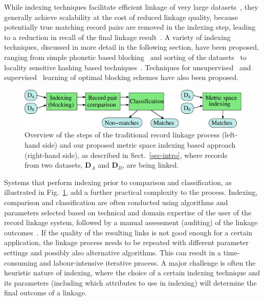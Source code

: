 \documentclass{llncs}
\begin{document}
While indexing techniques facilitate efficient linkage of very large
datasets~\cite{Don15}, they generally achieve scalability at the cost
of reduced linkage quality, because potentially true matching record
pairs are removed in the indexing step, leading to a reduction in recall
of the final linkage result~\cite{Chr12}. A variety of indexing
techniques, discussed in more detail in the following section, have
been proposed, ranging from simple phonetic based blocking~\cite{Chr12}
and sorting of the datasets~\cite{Dra12} to locality sensitive hashing
based techniques~\cite{Kim10,Steorts2014}. Techniques for
unsupervised~\cite{Kej13,Ram15} and supervised~\cite{Bil06,Mic06}
learning of optimal blocking schemes have also been proposed.

\begin{figure}[!t]
  \centering
  \includegraphics[width=1.0\textwidth]{figures/linkage-process}
  \caption{Overview of the steps of the traditional record linkage
           process (left-hand side) and our proposed metric space
           indexing based approach (right-hand side), as described in
           Sect.~\ref{sec-intro}, where records from two datasets,
           $\mathbf{D}_A$ and $\mathbf{D}_B$, are being linked.}
           \label{fig-rl-process}
\end{figure}

Systems that perform indexing prior to comparison and classification, as
illustrated in Fig.~\ref{fig-rl-process}, add a further practical
complexity to the process. Indexing, comparison and classification are
often conducted using algorithms and parameters selected based on
technical and domain expertise of the user of the record linkage system,
followed by a manual assessment (auditing) of the linkage
outcomes~\cite{Chr12}. If the quality of the resulting links is not good
enough for a certain application, the linkage process needs to be
repeated with different parameter settings and possibly also alternative
algorithms. This can result in a time-consuming and labour-intensive
iterative process. A major challenge is often the heuristic nature of
indexing, where the choice of a certain indexing technique and its
parameters (including which attributes to use in indexing) will
determine the final outcome of a linkage.
\end{document}
